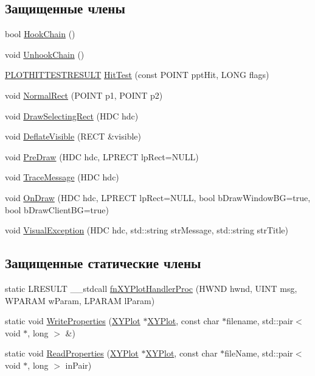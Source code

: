 \subsection*{Защищенные члены}
\begin{DoxyCompactItemize}
\item 
bool \hyperlink{class_x_y_plot_afbd5f2e97a28bb92f48ddc0093ffad31}{Hook\-Chain} ()
\item 
void \hyperlink{class_x_y_plot_ad2bbc6a467d11665ce59dc58ebaaadf8}{Unhook\-Chain} ()
\item 
\hyperlink{selection_8h_af0233194949269aa7eea2965cb34f30e}{P\-L\-O\-T\-H\-I\-T\-T\-E\-S\-T\-R\-E\-S\-U\-L\-T} \hyperlink{class_x_y_plot_af918a93570a36062b65ae0c9b4418a49}{Hit\-Test} (const P\-O\-I\-N\-T ppt\-Hit, L\-O\-N\-G flags)
\item 
void \hyperlink{class_x_y_plot_a7c4b733fea11143df033381c3ef1d75f}{Normal\-Rect} (P\-O\-I\-N\-T p1, P\-O\-I\-N\-T p2)
\item 
void \hyperlink{class_x_y_plot_ab76d33bf085e2d9fb3ca4d3e18839af3}{Draw\-Selecting\-Rect} (H\-D\-C hdc)
\item 
void \hyperlink{class_x_y_plot_aa96929d34d5226d1a313f5ef72166f8d}{Deflate\-Visible} (R\-E\-C\-T \&visible)
\item 
void \hyperlink{class_x_y_plot_a5f076922f20334df30e95e5df5242e6c}{Pre\-Draw} (H\-D\-C hdc, L\-P\-R\-E\-C\-T lp\-Rect=N\-U\-L\-L)
\item 
void \hyperlink{class_x_y_plot_afb0a757c5aaebd82ab5f69e3c7b648d7}{Trace\-Message} (H\-D\-C hdc)
\item 
void \hyperlink{class_x_y_plot_ac05cdbc99d5f25f01dd68a15ddea62f3}{On\-Draw} (H\-D\-C hdc, L\-P\-R\-E\-C\-T lp\-Rect=N\-U\-L\-L, bool b\-Draw\-Window\-B\-G=true, bool b\-Draw\-Client\-B\-G=true)
\item 
void \hyperlink{class_x_y_plot_a83e178fc20acf51c5200855884f0ff0a}{Visual\-Exception} (H\-D\-C hdc, std\-::string str\-Message, std\-::string str\-Title)
\end{DoxyCompactItemize}
\subsection*{Защищенные статические члены}
\begin{DoxyCompactItemize}
\item 
static L\-R\-E\-S\-U\-L\-T \-\_\-\-\_\-stdcall \hyperlink{class_x_y_plot_a674eddf4ad2ceda165e2a769e3a0f8a9}{fn\-X\-Y\-Plot\-Handler\-Proc} (H\-W\-N\-D hwnd, U\-I\-N\-T msg, W\-P\-A\-R\-A\-M w\-Param, L\-P\-A\-R\-A\-M l\-Param)
\item 
static void \hyperlink{class_x_y_plot_a44a6aa0993b5091fdfc207a5ef3e5201}{Write\-Properties} (\hyperlink{class_x_y_plot}{X\-Y\-Plot} $\ast$\hyperlink{class_x_y_plot}{X\-Y\-Plot}, const char $\ast$filename, std\-::pair$<$ void $\ast$, long $>$ \&)
\item 
static void \hyperlink{class_x_y_plot_aa6f841e3aa5771c6d431ebab4719c2f9}{Read\-Properties} (\hyperlink{class_x_y_plot}{X\-Y\-Plot} $\ast$\hyperlink{class_x_y_plot}{X\-Y\-Plot}, const char $\ast$file\-Name, std\-::pair$<$ void $\ast$, long $>$ in\-Pair)
\end{DoxyCompactItemize}
